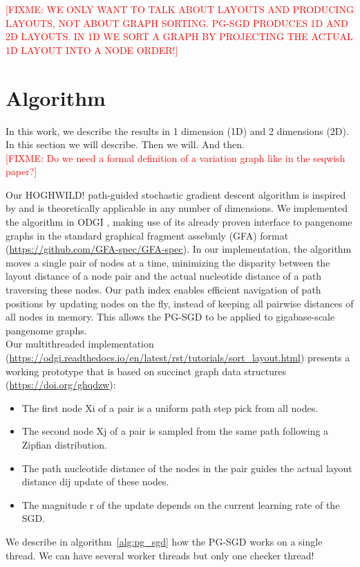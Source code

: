 \documentclass{bioinfo}
\theoremstyle{definition}
\newcommand{\red}[1]{{\textcolor{Red}{#1}}}
\newcommand{\FIXME}[1]{\red{[FIXME: #1]}}
\begin{document}
	
	\FIXME{WE ONLY WANT TO TALK ABOUT LAYOUTS AND PRODUCING LAYOUTS, NOT ABOUT GRAPH SORTING. PG-SGD PRODUCES 1D AND 2D LAYOUTS. IN 1D WE SORT A GRAPH BY PROJECTING THE ACTUAL 1D LAYOUT INTO A NODE ORDER!}
	
	\section{Algorithm}
	
	In this work, we describe the results in 1 dimension (1D) and 2 dimensions (2D). In this section we will describe. Then we will. And then. \\
	
	\FIXME{Do we need a formal definition of a variation graph like in the seqwish paper?}
	
	Our HOGHWILD! path-guided stochastic gradient descent algorithm is inspired by \cite{Zheng2019} and is theoretically applicable in any number of dimensions. 
	We implemented the algorithm in ODGI \citep{Guarracino2022}, making use of its already proven interface to pangenome graphs in the standard graphical fragment assebmly (GFA) format (\url{https://github.com/GFA-spec/GFA-spec}).
	In our implementation, the algorithm moves a single pair of nodes at a time, minimizing the disparity between the layout distance of a node pair and the actual nucleotide distance of a path traversing these nodes.
	Our path index enables efficient navigation of path positions by updating nodes on the fly, instead of keeping all pairwise distances of all nodes in memory.
	This allows the PG-SGD to be applied to gigabase-scale pangenome graphs. \\
	Our multithreaded implementation (\url{https://odgi.readthedocs.io/en/latest/rst/tutorials/sort_layout.html}) presents a working prototype that is based on succinct graph data structures (\url{https://doi.org/ghqdzw}):
	\begin{itemize}
	    \item The first node Xi of a pair is a uniform path step pick from all nodes.
	    \item The second node Xj of a pair is sampled from the same path following a Zipfian distribution.
	    \item The path nucleotide distance of the nodes in the pair guides the actual layout distance dij update of these nodes.
	    \item The magnitude r of the update depends on the current learning rate of the SGD.
	\end{itemize}
	We describe in algorithm~\ref{alg:pg_sgd} how the PG-SGD works on a single thread.
	We can have several worker threads but only one checker thread!
	
\end{document}
